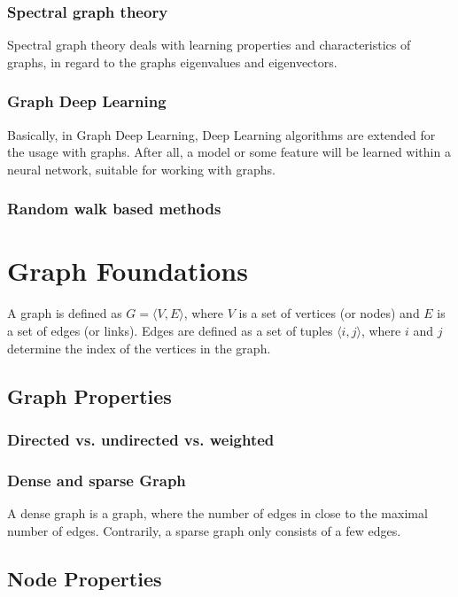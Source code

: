 \subsubsection{Spectral graph theory}
Spectral graph theory \cite{SpectralGraphTheory} deals with learning properties and characteristics of graphs, in regard to
the graphs eigenvalues and eigenvectors. 

\subsubsection{Graph Deep Learning}
Basically, in Graph Deep Learning, Deep Learning algorithms are extended for the usage with graphs.
After all, a model or some feature will be learned within a neural network, suitable for working with graphs.

\subsubsection{Random walk based methods}


\section{Graph Foundations}
A graph is defined as  $G = \langle V,E \rangle$, where $V$ is a set of 
vertices (or nodes) and $E$ is a set of edges (or links). Edges are 
defined as a set of tuples $\langle i,j \rangle$, where $i$ and $j$ determine the 
index of the vertices in the graph.

\subsection{Graph Properties}

\subsubsection{Directed vs. undirected vs. weighted}

\subsubsection{Dense and sparse Graph}
A dense graph is a graph, where the number of edges in close to the maximal number of edges.
Contrarily, a sparse graph only consists of a few edges.

\subsection{Node Properties}
